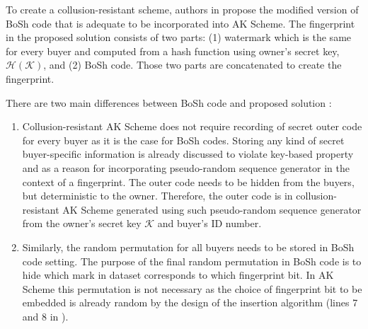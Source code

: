 To create a collusion-resistant scheme, authors in \cite{li2005fingerprinting} propose the modified version of BoSh code that is adequate to be incorporated into AK Scheme. 
The fingerprint in the proposed solution consists of two parts: (1) watermark which is the same for every buyer and computed from a hash function using owner's secret key, $\mathcal{H}(\mathcal{K})$, and (2) BoSh code. 
Those two parts are concatenated to create the fingerprint.

There are two main differences between BoSh code and proposed solution \cite{li2005fingerprinting}:
\begin{enumerate}
    \item Collusion-resistant AK Scheme does not require recording of secret outer code for every buyer as it is the case for BoSh codes. Storing any kind of secret buyer-specific information is already discussed to violate key-based property and as a reason for incorporating pseudo-random sequence generator in the context of a fingerprint. The outer code needs to be hidden from the buyers, but deterministic to the owner. Therefore, the outer code is in collusion-resistant AK Scheme generated using such pseudo-random sequence generator from the owner's secret key $\mathcal{K}$ and buyer's ID number.
    
    \item Similarly, the random permutation for all buyers needs to be stored in BoSh code setting. The purpose of the final random permutation in BoSh code is to hide which mark in dataset corresponds to which fingerprint bit. In AK Scheme this permutation is not necessary as the choice of fingerprint bit to be embedded is already random by the design of the insertion algorithm (lines 7 and 8 in ).
    
\end{enumerate}

